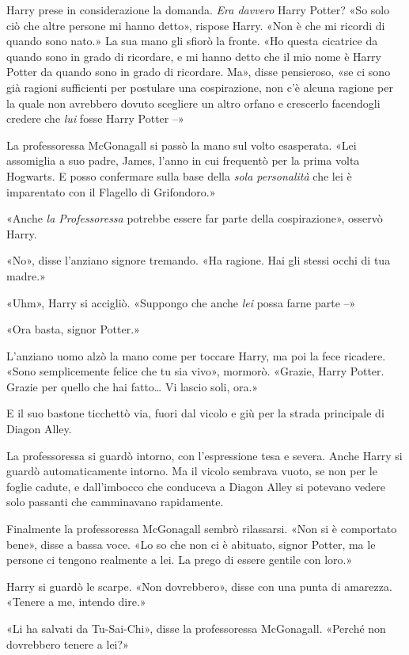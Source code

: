 Harry prese in considerazione la domanda. \textit{Era davvero} Harry Potter? «So solo ciò che altre persone mi hanno detto», rispose Harry. «Non è che mi ricordi di quando sono nato.» La sua mano gli sfiorò la fronte. «Ho questa cicatrice da quando sono in grado di ricordare, e mi hanno detto che il mio nome è Harry Potter da quando sono in grado di ricordare. Ma», disse pensieroso, «se ci sono già ragioni sufficienti per postulare una cospirazione, non c’è alcuna ragione per la quale non avrebbero dovuto scegliere un altro orfano e crescerlo facendogli credere che \textit{lui} fosse Harry Potter –»

La professoressa McGonagall si passò la mano sul volto esasperata. «Lei assomiglia a suo padre, James, l’anno in cui frequentò per la prima volta Hogwarts. E posso confermare sulla base della \textit{sola personalità} che lei è imparentato con il Flagello di Grifondoro.»

«Anche \textit{la Professoressa} potrebbe essere far parte della cospirazione», osservò Harry.

«No», disse l’anziano signore tremando. «Ha ragione. Hai gli stessi occhi di tua madre.»

«Uhm», Harry si accigliò. «Suppongo che anche \textit{lei} possa farne parte –»

«Ora basta, signor Potter.»

L’anziano uomo alzò la mano come per toccare Harry, ma poi la fece ricadere. «Sono semplicemente felice che tu sia vivo», mormorò. «Grazie, Harry Potter. Grazie per quello che hai fatto… Vi lascio soli, ora.»

E il suo bastone ticchettò via, fuori dal vicolo e giù per la strada principale di Diagon Alley.

La professoressa si guardò intorno, con l’espressione tesa e severa. Anche Harry si guardò automaticamente intorno. Ma il vicolo sembrava vuoto, se non per le foglie cadute, e dall’imbocco che conduceva a Diagon Alley si potevano vedere solo passanti che camminavano rapidamente.

Finalmente la professoressa McGonagall sembrò rilassarsi. «Non si è comportato bene», disse a bassa voce. «Lo so che non ci è abituato, signor Potter, ma le persone ci tengono realmente a lei. La prego di essere gentile con loro.»

Harry si guardò le scarpe. «Non dovrebbero», disse con una punta di amarezza. «Tenere a me, intendo dire.»

«Li ha salvati da Tu-Sai-Chi», disse la professoressa McGonagall. «Perché non dovrebbero tenere a lei?»

